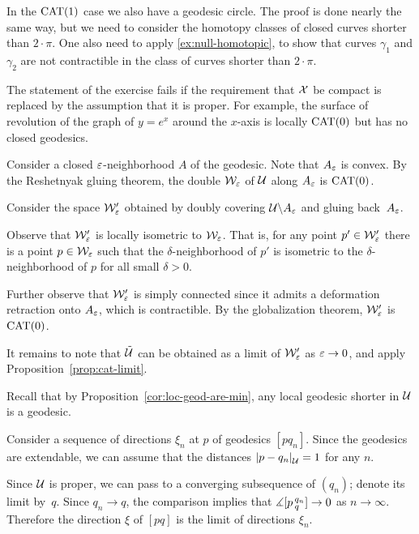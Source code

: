 In the $\mathrm{CAT}(1)$ case we also have a geodesic circle.
The proof is done nearly the same way, but we need to consider the homotopy classes of closed curves shorter than $2\cdot \pi$.
One also need to apply \ref{ex:null-homotopic}, to show that curves $\gamma_1$ and $\gamma_2$ are not contractible in the class of curves shorter than $2\cdot \pi$.

The statement of the exercise fails if the requirement that $\mathcal{X}$ be compact is replaced by the assumption that it is proper. For example, the surface of revolution of the graph of $y=e^x$ around the $x$-axis is locally $\mathrm{CAT}(0)$ but has no closed geodesics.


Consider a closed $\varepsilon$-neighborhood $A$ of the geodesic.
Note that $A_\varepsilon$ is convex.
By the Reshetnyak gluing theorem, the double $\mathcal{W}_\varepsilon$ of $\mathcal{U}$ along $A_\varepsilon$ is $\mathrm{CAT}(0)$.

Consider the space $\mathcal{W}'_\varepsilon$ obtained by doubly covering $\mathcal{U}\backslash A_\varepsilon$ and gluing back~$A_\varepsilon$.

Observe that $\mathcal{W}'_\varepsilon$ is locally isometric to $\mathcal{W}_\varepsilon$. 
That is, for any point $p'\in\mathcal{W}'_\varepsilon$ there is a point $p\in\mathcal{W}_\varepsilon$ such that the $\delta$-neighborhood of $p'$ is isometric to the $\delta$-neighborhood of $p$ for all small $\delta>0$.

Further observe that $\mathcal{W}'_\varepsilon$ is simply connected since it admits a deformation retraction onto $A_\varepsilon$, which is contractible.
By the globalization theorem, $\mathcal{W}'_\varepsilon$ is $\mathrm{CAT}(0)$.

It remains to note that $\tilde {\mathcal{U}}$ can be obtained as a limit of $\mathcal{W}'_\varepsilon$ as $\varepsilon\to 0$, and apply Proposition~\ref{prop:cat-limit}.

Recall that by Proposition~\ref{cor:loc-geod-are-min}, any local geodesic shorter in $\mathcal{U}$ is a geodesic.

Consider a sequence of directions $\xi_n$ 
at $p$
of geodesics $[pq_n]$.
Since the geodesics are extendable, we can assume that the distances $\dist{p}{q_n}{\spc{U}}=1$ for any $n$.

Since $\mathcal{U}$ is proper,
we can pass to a converging subsequence of $(q_n)$;
denote its limit by~$q$.
Since $q_n\to q$, the comparison implies that $\measuredangle[p\,{}^{q_n}_{q}]\to 0$ as $n\to \infty$.
Therefore the direction $\xi$ of $[pq]$ is the limit of directions $\xi_n$.

